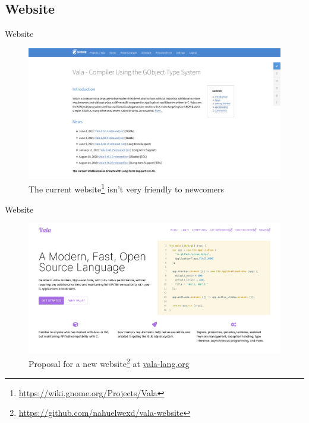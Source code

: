 \documentclass[t]{beamer}
\newcommand{\fancyurl}[1]{\href{#1}{#1}}
\begin{document}
\subsection{Website}
\begin{frame}[c]{Website}
    \begin{figure}
        \begin{center}
            \includegraphics[scale=.1]{res/Screenshot 2021-06-22 at 12-08-52 Projects Vala - GNOME Wiki.png}
            \caption{The current website\footnote{{\scriptsize \fancyurl{https://wiki.gnome.org/Projects/Vala}}} isn't very friendly to newcomers}
        \end{center}
    \end{figure}
\end{frame}

\begin{frame}[c]{Website}
    \begin{figure}
        \begin{center}
            \includegraphics[scale=.1]{res/Screenshot 2021-06-22 at 12-17-51 Vala Programming Language.png}
            \caption{Proposal for a new website\footnote{{\scriptsize \fancyurl{https://github.com/nahuelwexd/vala-website}}} at \href{https://vala-lang.org}{vala-lang.org}}
        \end{center}
    \end{figure}
\end{frame}
\end{document}

